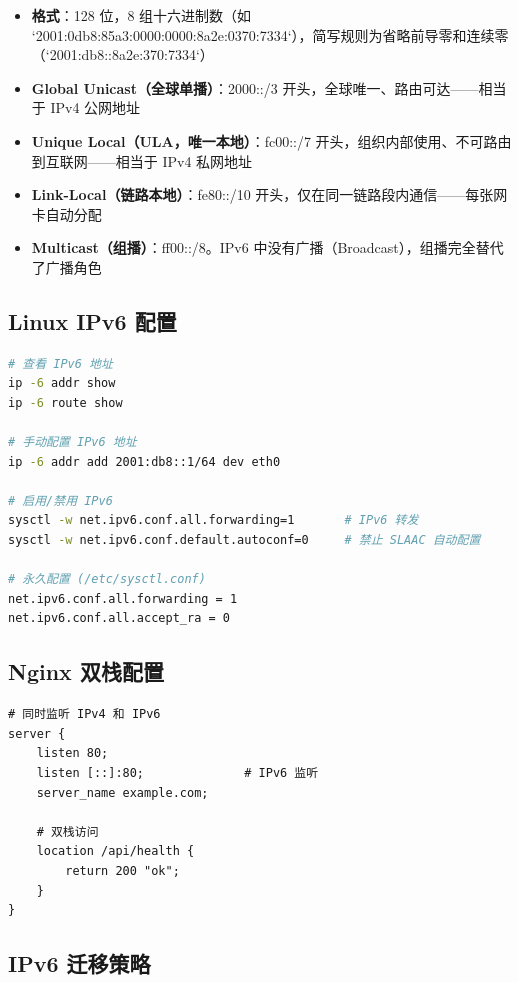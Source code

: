 \documentclass[12pt,UTF8]{ctexbook}
\begin{document}
\begin{itemize}
    \item \textbf{格式}：128 位，8 组十六进制数（如 `2001:0db8:85a3:0000:0000:8a2e:0370:7334`），简写规则为省略前导零和连续零（`2001:db8::8a2e:370:7334`）
    \item \textbf{Global Unicast（全球单播）}：2000::/3 开头，全球唯一、路由可达——相当于 IPv4 公网地址
    \item \textbf{Unique Local（ULA，唯一本地）}：fc00::/7 开头，组织内部使用、不可路由到互联网——相当于 IPv4 私网地址
    \item \textbf{Link-Local（链路本地）}：fe80::/10 开头，仅在同一链路段内通信——每张网卡自动分配
    \item \textbf{Multicast（组播）}：ff00::/8。IPv6 中没有广播（Broadcast），组播完全替代了广播角色
\end{itemize}

\subsection*{Linux IPv6 配置}

\begin{lstlisting}[language=bash]
# 查看 IPv6 地址
ip -6 addr show
ip -6 route show

# 手动配置 IPv6 地址
ip -6 addr add 2001:db8::1/64 dev eth0

# 启用/禁用 IPv6
sysctl -w net.ipv6.conf.all.forwarding=1       # IPv6 转发
sysctl -w net.ipv6.conf.default.autoconf=0     # 禁止 SLAAC 自动配置

# 永久配置 (/etc/sysctl.conf)
net.ipv6.conf.all.forwarding = 1
net.ipv6.conf.all.accept_ra = 0
\end{lstlisting}

\subsection*{Nginx 双栈配置}

\begin{lstlisting}[language=nginx]
# 同时监听 IPv4 和 IPv6
server {
    listen 80;
    listen [::]:80;              # IPv6 监听
    server_name example.com;
    
    # 双栈访问
    location /api/health {
        return 200 "ok";
    }
}
\end{lstlisting}

\subsection*{IPv6 迁移策略}
\end{document}
